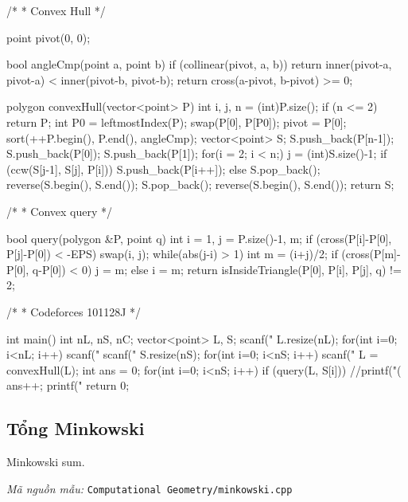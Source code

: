 \documentclass[11pt]{article}
\newcommand{\codepath}[1]{\par\noindent\textit{Mã nguồn mẫu:} \texttt{#1}\par}
\begin{document}
\begin{vncode}
/*
 * Convex Hull
 */

point pivot(0, 0);

bool angleCmp(point a, point b) {
	if (collinear(pivot, a, b))
		return inner(pivot-a, pivot-a) < inner(pivot-b, pivot-b);
	return cross(a-pivot, b-pivot) >= 0;
}

polygon convexHull(vector<point> P) {
	int i, j, n = (int)P.size();
	if (n <= 2) return P;
	int P0 = leftmostIndex(P);
	swap(P[0], P[P0]);
	pivot = P[0];
	sort(++P.begin(), P.end(), angleCmp);
	vector<point> S;
	S.push_back(P[n-1]);
	S.push_back(P[0]);
	S.push_back(P[1]);
	for(i = 2; i < n;) {
		j = (int)S.size()-1;
		if (ccw(S[j-1], S[j], P[i])) S.push_back(P[i++]);
		else S.pop_back();
	}
	reverse(S.begin(), S.end());
	S.pop_back();
	reverse(S.begin(), S.end());
	return S;
}

/*
 * Convex query
 */

bool query(polygon &P, point q) {
	int i = 1, j = P.size()-1, m;
	if (cross(P[i]-P[0], P[j]-P[0]) < -EPS)
		swap(i, j);
	while(abs(j-i) > 1) {
		int m = (i+j)/2;
		if (cross(P[m]-P[0], q-P[0]) < 0) j = m;
		else i = m;
	}
	return isInsideTriangle(P[0], P[i], P[j], q) != 2;
}

/*
 * Codeforces 101128J
 */

int main() {
	int nL, nS, nC;
	vector<point> L, S;
	scanf("%
	L.resize(nL);
	for(int i=0; i<nL; i++) {
		scanf("%
	}
	scanf("%
	S.resize(nS);
	for(int i=0; i<nS; i++) {
		scanf("%
	}
	L = convexHull(L);
	int ans = 0;
	for(int i=0; i<nS; i++) {
		if (query(L, S[i])) {
			//printf("(%
			ans++;
		}
	}
	printf("%
	return 0;
}
\end{vncode}
\endgroup


\subsection{Tổng Minkowski}

Minkowski sum.

\codepath{Computational Geometry/minkowski.cpp}
\end{document}
